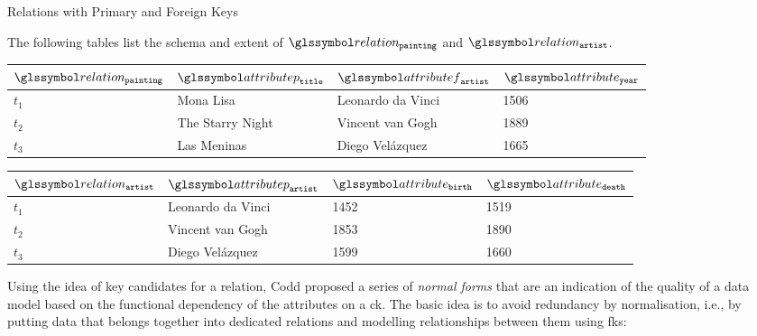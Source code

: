 \begin{example}[label=example:relational_table_pkfk]{Relations with Primary and Foreign Keys}{}
    
    The following tables list the schema and extent of $\relation_{\mathtt{painting}}$ and $\relation_{\mathtt{artist}}$.
    \begin{center}
        \begin{tabular}{ l || l | l | l |}
            $\relation_{\mathtt{painting}}$ & $\attributep_{\mathtt{title}}$  & $\attributef_{\mathtt{artist}}$  & $\attribute_{\mathtt{year}}$ \\ 
            \hline
            \hline
            $t_1$ & Mona Lisa &  Leonardo da Vinci & 1506 \\
            \hline
            $t_2$ & The Starry Night & Vincent van Gogh & 1889 \\
            \hline
            $t_3$ & Las Meninas & Diego Velázquez & 1665 \\
            \hline
        \end{tabular}
    \end{center}

    \begin{center}
        \begin{tabular}{ l || l | l | l |}
            $\relation_{\mathtt{artist}}$ & $\attributep_{\mathtt{artist}}$ & $\attribute_{\mathtt{birth}}$ & $\attribute_{\mathtt{death}}$\\ 
            \hline
            \hline
            $t_1$ & Leonardo da Vinci & 1452 & 1519 \\
            \hline
            $t_2$ & Vincent van Gogh & 1853 & 1890 \\
            \hline
            $t_3$ & Diego Velázquez & 1599 & 1660 \\
            \hline
        \end{tabular}
    \end{center}
\end{example}

Using the idea of key candidates for a relation, Codd proposed a series of \emph{normal forms} that are an indication of the quality of a data model based on the functional dependency of the attributes on a \acrshort{ck}. The basic idea is to avoid redundancy by normalisation, i.e., by putting data that belongs together into dedicated relations and modelling relationships between them using \acrshort{fk}s:

